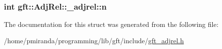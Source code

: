 \subsubsection[{\texorpdfstring{n}{n}}]{\setlength{\rightskip}{0pt plus 5cm}int gft\+::\+Adj\+Rel\+::\+\_\+adjrel\+::n}\hypertarget{structgft_1_1AdjRel_1_1__adjrel_a2728c9b893dfb77f919d79963cda39d8}{}\label{structgft_1_1AdjRel_1_1__adjrel_a2728c9b893dfb77f919d79963cda39d8}


The documentation for this struct was generated from the following file\+:\begin{DoxyCompactItemize}
\item 
/home/pmiranda/programming/lib/gft/include/\hyperlink{gft__adjrel_8h}{gft\+\_\+adjrel.\+h}\end{DoxyCompactItemize}
